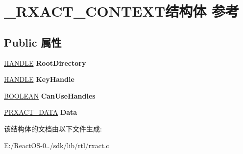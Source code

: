 \hypertarget{struct___r_x_a_c_t___c_o_n_t_e_x_t}{}\section{\+\_\+\+R\+X\+A\+C\+T\+\_\+\+C\+O\+N\+T\+E\+X\+T结构体 参考}
\label{struct___r_x_a_c_t___c_o_n_t_e_x_t}
\subsection*{Public 属性}
\begin{DoxyCompactItemize}
\item 
\mbox{\label{struct___r_x_a_c_t___c_o_n_t_e_x_t_af116a5e8aa57049323b13851bcdf743b}} 
\hyperlink{interfacevoid}{H\+A\+N\+D\+LE} {\bfseries Root\+Directory}
\item 
\mbox{\label{struct___r_x_a_c_t___c_o_n_t_e_x_t_a0328b3e6372220589e372eb58058810c}} 
\hyperlink{interfacevoid}{H\+A\+N\+D\+LE} {\bfseries Key\+Handle}
\item 
\mbox{\label{struct___r_x_a_c_t___c_o_n_t_e_x_t_a70e3f87035fa4af8721ef87f698a88fb}} 
\hyperlink{_processor_bind_8h_a112e3146cb38b6ee95e64d85842e380a}{B\+O\+O\+L\+E\+AN} {\bfseries Can\+Use\+Handles}
\item 
\mbox{\label{struct___r_x_a_c_t___c_o_n_t_e_x_t_aaca24cbf960b1a5a409bda73a8bdf961}} 
\hyperlink{struct___r_x_a_c_t___d_a_t_a}{P\+R\+X\+A\+C\+T\+\_\+\+D\+A\+TA} {\bfseries Data}
\end{DoxyCompactItemize}


该结构体的文档由以下文件生成\+:\begin{DoxyCompactItemize}
\item 
E\+:/\+React\+O\+S-\/0../sdk/lib/rtl/rxact.\+c\end{DoxyCompactItemize}
